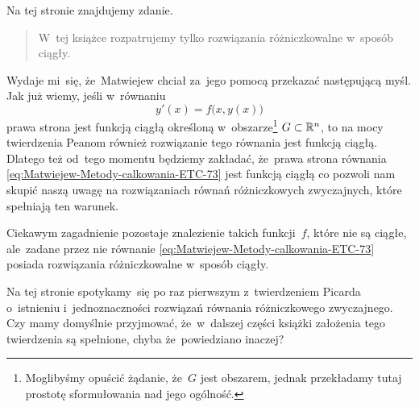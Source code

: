 \documentclass[a4paper,11pt]{article}
\numberwithin{equation}{section}
\begin{document}
\VerSpaceFour





\noindent
{} Na tej stronie znajdujemy zdanie.
\begin{quote}

  W~tej książce rozpatrujemy tylko rozwiązania różniczkowalne w~sposób
  ciągły.

\end{quote}
Wydaje mi~się, że~Matwiejew chciał za~jego pomocą przekazać następującą
myśl. Jak już wiemy, jeśli w~równaniu
\begin{equation}
  \label{eq:Matwiejew-Metody-calkowania-ETC-73}
  y'( x ) = f\big( x, y( x ) \big)
\end{equation}
prawa strona jest funkcją ciągłą określoną w~obszarze\footnote{Moglibyśmy
  opuścić żądanie, że~$G$ jest obszarem, jednak przekładamy tutaj
  prostotę sformułowania nad jego ogólność.}
$G \subset \mathbb{R}^{ n }$, to na mocy twierdzenia Peanom również rozwiązanie tego
równania jest funkcją ciągłą. Dlatego też od~tego momentu będziemy
zakładać, że~prawa strona równania
\eqref{eq:Matwiejew-Metody-calkowania-ETC-73} jest funkcją ciągłą
co pozwoli nam skupić naszą uwagę na rozwiązaniach równań różniczkowych
zwyczajnych, które spełniają ten warunek.

Ciekawym zagadnienie pozostaje znalezienie takich funkcji~$f$, które
nie są ciągłe, ale~zadane przez nie równanie
\eqref{eq:Matwiejew-Metody-calkowania-ETC-73} posiada rozwiązania
różniczkowalne w~sposób ciągły.

\VerSpaceFour





\noindent
{} Na tej stronie spotykamy~się po raz pierwszym z~twierdzeniem
Picarda o~istnieniu i~jednoznaczności rozwiązań równania różniczkowego
zwyczajnego. Czy mamy domyślnie przyjmować, że~w~dalszej części książki
założenia tego twierdzenia są spełnione, chyba że~powiedziano inaczej?

\VerSpaceFour
\end{document}
